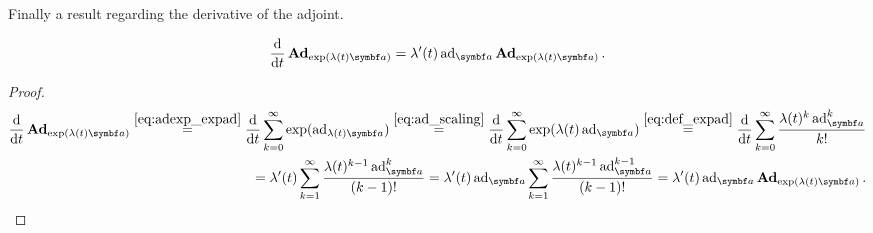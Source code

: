 Finally a result regarding the derivative of the adjoint.

\begin{lemma}
  \label{lem:d_bad_exp}
  \begin{equation}
    \frac{\mathrm{d}}{\mathrm{d}t} \bAd_{\exp(\lambda(t) \a)} = \lambda'(t) \ad_{\a} \bAd_{\exp(\lambda(t) \a)}.
  \end{equation}
\end{lemma}
\begin{proof}
  \begin{equation}
    \begin{aligned}
      \frac{\mathrm{d}}{\mathrm{d}t} \bAd_{\exp(\lambda(t) \a)}
      \overset{\eqref{eq:adexp_expad}}= \frac{\mathrm{d}}{\mathrm{d}t} \sum_{k = 0}^\infty \exp(\ad_{\lambda(t) \a})
      \overset{\eqref{eq:ad_scaling}}= \frac{\mathrm{d}}{\mathrm{d}t} \sum_{k = 0}^\infty \exp(\lambda(t) \ad_{\a})
      \overset{\eqref{eq:def_expad}}= \frac{\mathrm{d}}{\mathrm{d}t} \sum_{k=0}^{\infty} \frac{\lambda(t)^{k} \ad_{\a}^{k}}{k!} \\
      = \lambda'(t) \sum_{k=1}^{\infty} \frac{\lambda(t)^{k-1} \ad_{\a}^{k}}{(k-1)!} = \lambda'(t) \ad_{\a} \sum_{k=1}^{\infty} \frac{\lambda(t)^{k-1} \ad_{\a}^{k-1}}{(k-1)!} = \lambda'(t) \ad_{\a} \bAd_{\exp(\lambda(t) \a)}.
    \end{aligned}
  \end{equation}
\end{proof}
